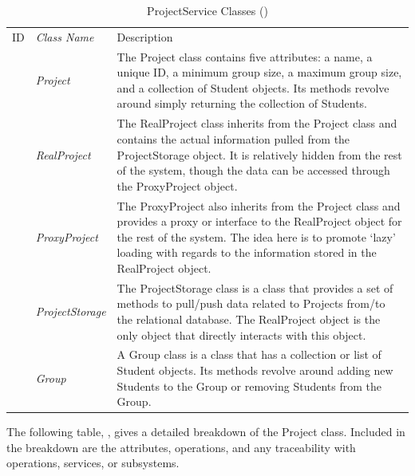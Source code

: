 \documentclass[12pt,letterpaper]{article}
\begin{document}
\begin{table}[H]
	\caption{ProjectService Classes ()} 
	\begin{tabu} to 
	    \tableheader{}ID & Class Name & Description \\
		 & Project & The Project class contains five attributes: a name, a unique ID, a minimum group size, a maximum group size, and a collection of Student objects. Its methods revolve around simply returning the collection of Students.\\
		 & RealProject & The RealProject class inherits from the Project class and contains the actual information pulled from the ProjectStorage object. It is relatively hidden from the rest of the system, though the data can be accessed through the ProxyProject object.\\
		 & ProxyProject & The ProxyProject also inherits from the Project class and provides a proxy or interface to the RealProject object for the rest of the system. The idea here is to promote `lazy' loading with regards to the information stored in the RealProject object.\\
		 & ProjectStorage & The ProjectStorage class is a class that provides a set of methods to pull/push data related to Projects from/to the relational database. The RealProject object is the only object that directly interacts with this object.\\
		 & Group & A Group class is a class that has a collection or list of Student objects. Its methods revolve around adding new Students to the Group or removing Students from the Group.\\
	\end{tabu}
\end{table}

\newpage{}
The following table, , gives a detailed breakdown of the Project class. Included in the breakdown are the attributes, operations, and any traceability with operations, services, or subsystems.
\end{document}
